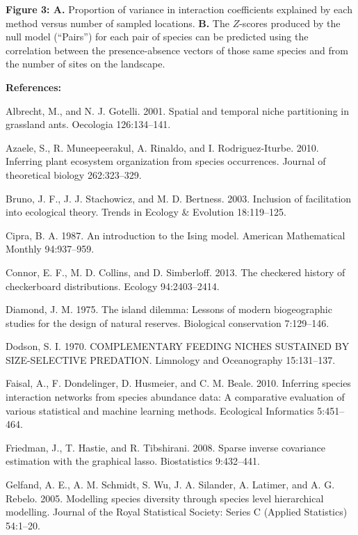 \documentclass[12pt,]{article}
\begin{document}
\begin{spacing}{1.9}
\begin{flushleft}
\textbf{Figure 3: A.} Proportion of variance in interaction coefficients
explained by each method versus number of sampled locations. \textbf{B.}
The \(Z\)-scores produced by the null model (``Pairs'') for each pair of
species can be predicted using the correlation between the
presence-absence vectors of those same species and from the number of
sites on the landscape.

\textbf{References:}

\setlength{\parskip}{0pt} \setlength{\parindent}{-1em}
\setlength{\leftskip}{1em}

Albrecht, M., and N. J. Gotelli. 2001. Spatial and temporal niche
partitioning in grassland ants. Oecologia 126:134--141.

Azaele, S., R. Muneepeerakul, A. Rinaldo, and I. Rodriguez-Iturbe. 2010.
Inferring plant ecosystem organization from species occurrences. Journal
of theoretical biology 262:323--329.

Bruno, J. F., J. J. Stachowicz, and M. D. Bertness. 2003. Inclusion of
facilitation into ecological theory. Trends in Ecology \& Evolution
18:119--125.

Cipra, B. A. 1987. An introduction to the Ising model. American
Mathematical Monthly 94:937--959.

Connor, E. F., M. D. Collins, and D. Simberloff. 2013. The checkered
history of checkerboard distributions. Ecology 94:2403--2414.

Diamond, J. M. 1975. The island dilemma: Lessons of modern biogeographic
studies for the design of natural reserves. Biological conservation
7:129--146.

Dodson, S. I. 1970. COMPLEMENTARY FEEDING NICHES SUSTAINED BY
SIZE-SELECTIVE PREDATION. Limnology and Oceanography 15:131--137.

Faisal, A., F. Dondelinger, D. Husmeier, and C. M. Beale. 2010.
Inferring species interaction networks from species abundance data: A
comparative evaluation of various statistical and machine learning
methods. Ecological Informatics 5:451--464.

Friedman, J., T. Hastie, and R. Tibshirani. 2008. Sparse inverse
covariance estimation with the graphical lasso. Biostatistics
9:432--441.

Gelfand, A. E., A. M. Schmidt, S. Wu, J. A. Silander, A. Latimer, and A.
G. Rebelo. 2005. Modelling species diversity through species level
hierarchical modelling. Journal of the Royal Statistical Society: Series
C (Applied Statistics) 54:1--20.


\end{flushleft}
\end{spacing}
\end{document}
